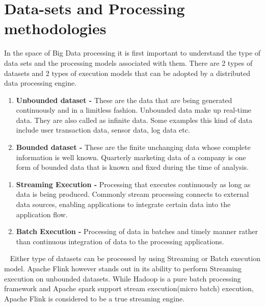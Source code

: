 \section{Data-sets and Processing methodologies}
In the space of Big Data processing it is first important to understand the type
of data sets and the processing models associated with them. There are 2 types
of datasets and 2 types of execution models that can be adopted by a distributed
data processing engine.
\begin{enumerate}
    \item \textbf{Unbounded dataset - } These are the data that are being
    generated continuously and in a limitless fashion. Unbounded data make up
    real-time data. They are also called as infinite data. Some examples this
    kind of data include user transaction data, sensor data, log data etc.
    \item \textbf{Bounded dataset - } These are the finite unchanging data whose
    complete information is well known. Quarterly marketing data of a company is
    one form of bounded data that is known and fixed during the time of analysis.
\end{enumerate}
\begin{enumerate}
    \item \textbf{Streaming Execution - } Processing that executes continuously
    as long as data is being produced. Commonly stream processing connects to
    external data sources, enabling applications to integrate certain data into
    the application flow.
    \item \textbf{Batch Execution - } Processing of data in batches and timely
    manner rather than continuous integration of data to the processing
    applications.
\end{enumerate} ~\cite{Apache-Flink}
Either type of datasets can be processed by using Streaming or Batch execution
model. Apache Flink however stands out in its ability to perform Streaming
execution on unbounded datasets. While Hadoop is a pure batch processing
framework and Apache spark support stream execution(micro batch)  execution,
Apache Flink is considered to be a true streaming engine.
